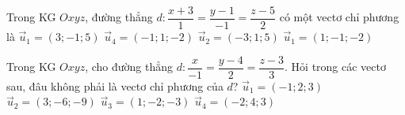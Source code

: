 \begin{ex}%
	Trong KG $Oxyz$, đường thẳng $d:\dfrac{x+3}{1}=\dfrac{y-1}{-1}=\dfrac{z-5}{2}$ có một vectơ chỉ phương là
	\choice
		{$\overrightarrow{u}_1=\left(3;-1; 5\right)$}
		{\True $\overrightarrow{u}_4=\left(-1; 1;-2\right)$}
		{$\overrightarrow{u}_2=\left(-3; 1; 5\right)$}
		{$\overrightarrow{u}_1=\left(1;-1;-2\right)$}
\end{ex}

\begin{ex}%
	Trong KG $Oxyz$, cho đường thẳng $d:\dfrac{x}{-1}=\dfrac{y-4}{2}=\dfrac{z-3}{3}$. Hỏi trong các vectơ sau, đâu không phải là vectơ chỉ phương của $d$?
	\choice
		{$\overrightarrow{u}_1=\left(-1;2;3\right)$}
		{$\overrightarrow{u}_2=\left(3;-6;-9\right)$}
		{$\overrightarrow{u}_3=\left(1;-2;-3\right)$}
		{\True $\overrightarrow{u}_4=\left(-2;4;3\right)$}
\end{ex}
 

 

